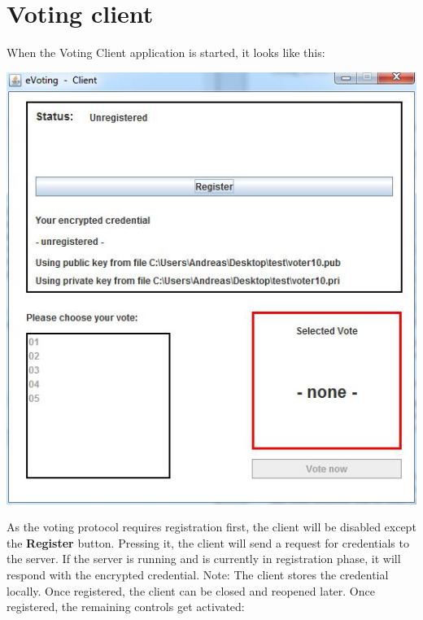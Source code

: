 \documentclass{article}
\begin{document}
\section{Voting client}
When the Voting Client application is started, it looks like this:
\begin{center}
\includegraphics{./client.jpg}
\end{center}
As the voting protocol requires registration first, the client will be disabled except the \textbf{Register} button. Pressing it, the client will send a request for credentials to the server. If the server is running and is currently in registration phase, it will respond with the encrypted credential. 
Note: The client stores the credential locally. Once registered, the client can be closed and reopened later.
Once registered, the remaining controls get activated:
\end{document}
